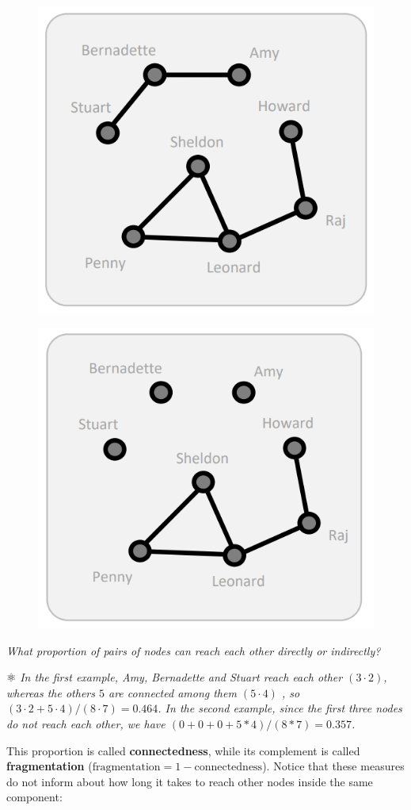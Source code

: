 \documentclass[
  notitlepage,
  onecolumn,
  openany]{book}
\begin{document}
\begin{figure}[h!]

{\centering \includegraphics[width=0.5\linewidth]{images/03-Cohesion measures/Untitled 2} 

}

\end{figure}

\begin{figure}[h!]

{\centering \includegraphics[width=0.5\linewidth]{images/03-Cohesion measures/Untitled 3} 

}

\end{figure}

\emph{What proportion of pairs of nodes can reach each other directly or indirectly?}

⚛️ \emph{In the first example, Amy, Bernadette and Stuart reach each other \((3\cdot2)\), whereas the others \(5\) are connected among them \((5\cdot4)\) , so \((3\cdot2+5\cdot4)/(8\cdot7) = 0.464\).
In the second example, since the first three nodes do not reach each other, we have \((0+0+0+5*4)/(8*7) = 0.357\).}

This proportion is called \textbf{connectedness}, while its complement is called \textbf{fragmentation} (\(\text{fragmentation} = 1-\text{connectedness}\)). Notice that these measures do not inform about how long it takes to reach other nodes inside the same component:
\end{document}
